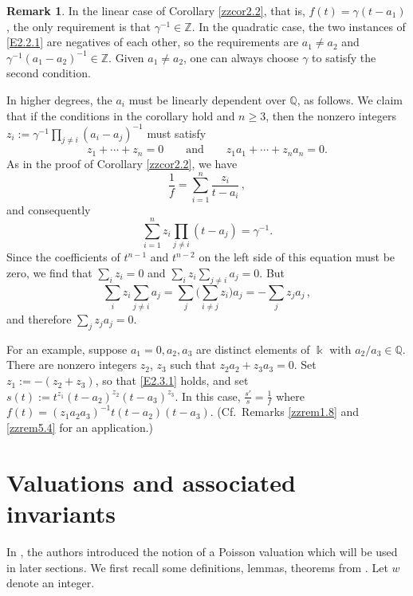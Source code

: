 \documentclass[12pt]{amsart}
\theoremstyle{plain}
\numberwithin{theorem}{section}
\numberwithin{equation}{theorem}
\theoremstyle{definition}
\newtheorem{remark}[theorem]{Remark}
\newcommand{\QQ}{\mathbb{Q}}
\newcommand{\ZZ}{\mathbb{Z}}
\begin{document}
\begin{remark}  
\label{zzrem2.3} 
In the linear case of Corollary \ref{zzcor2.2}, that 
is, $f(t) = \gamma(t-a_1)$, the only requirement is that 
$\gamma^{-1} \in \ZZ$. In the quadratic case, the two 
instances of \eqref{E2.2.1} are negatives of each other, 
so the requirements are $a_1 \ne a_2$ and 
$\gamma^{-1} (a_1-a_2)^{-1} \in \ZZ$. Given $a_1 \ne a_2$, 
one can always choose $\gamma$ to satisfy the second condition.

In higher degrees, the $a_i$ must be linearly dependent 
over $\QQ$, as follows. We claim that if the conditions 
in the corollary hold and $n \ge 3$, then the nonzero 
integers $z_i := \gamma^{-1} \prod_{j\ne i} (a_i-a_j)^{-1}$ 
must satisfy
\begin{equation}  
\label{E2.3.1}\tag{E2.3.1}
z_1 + \cdots + z_n = 0 \qquad\text{and}
\qquad z_1a_1 + \cdots + z_na_n = 0.
\end{equation}
As in the proof of Corollary \ref{zzcor2.2}, we have
$$
\frac1f = \sum_{i=1}^n \frac{z_i}{t-a_i} \,,
$$
and consequently
$$
\sum_{i=1}^n z_i \prod_{j\ne i} (t-a_j) = \gamma^{-1}.
$$
Since the coefficients of $t^{n-1}$ and $t^{n-2}$ on the 
left side of this equation must be zero, we find that 
$\sum_i z_i = 0$ and $\sum_i z_i \sum_{j\ne i} a_j = 0$. But
$$
\sum_i z_i \sum_{j\ne i} a_j = 
\sum_j \biggl( \sum_{i\ne j} z_i \biggr) a_j = - \sum_j z_j a_j \,,
$$
and therefore $\sum_j z_ja_j = 0$.

For an example, suppose $a_1=0,a_2,a_3$ are distinct elements 
of $\Bbbk$ with $a_2/a_3 \in \QQ$. There are nonzero integers 
$z_2$, $z_3$ such that $z_2a_2 + z_3a_3 = 0$. Set 
$z_1 := - (z_2+z_3)$, so that \eqref{E2.3.1} holds, and set 
$s(t) := t^{z_1} (t-a_2)^{z_2} (t-a_3)^{z_3}$. In this case, 
$\frac{s'}{s} = \frac1f$ where $f(t) = (z_1a_2a_3)^{-1}t (t-a_2) (t-a_3)$. 
(Cf.~Remarks \ref{zzrem1.8} and \ref{zzrem5.4} 
for an application.)
\end{remark}


\section{Valuations and associated invariants}
\label{zzsec3}

In \cite{HTWZ1, HTWZ2}, the authors 
introduced the notion of a Poisson valuation 
which will be used in later sections. We 
first recall some definitions, lemmas, theorems 
from \cite{HTWZ1, HTWZ2}. Let $w$ denote an 
integer.
\end{document}
